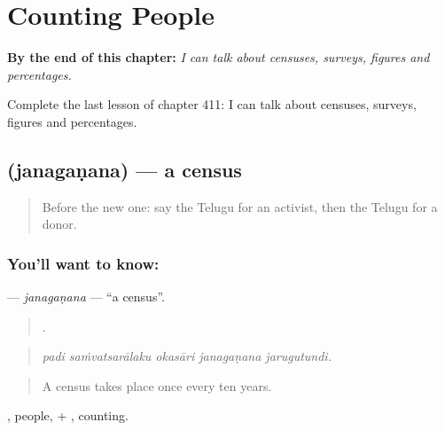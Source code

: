 
\chapter{Counting People}
\label{ch:te-counting-people}

\begin{chapteropening}
\textbf{By the end of this chapter:} \emph{I can talk about censuses, surveys, figures and percentages.}

Complete the last lesson of chapter 411: I can talk about censuses, surveys, figures and percentages.
\end{chapteropening}

\section[\texorpdfstring{\te{జనగణన} (janagaṇana)}{జనగణన (janagaṇana)}]{ (janagaṇana) — a census}

\label{lesson:TE-C411-janaganana}



\begin{quote}
Before the new one: say the Telugu for an activist, then the Telugu for a donor.
\end{quote}

\subsection*{You'll want to know: }
\textbf{} — \emph{janagaṇana} — \textquotedblleft{}a census\textquotedblright{}.

\begin{quote}
    .
\end{quote}

\begin{quote}
\emph{padi saṁvatsarālaku okasāri janagaṇana jarugutundi.}
\end{quote}

\begin{quote}
A census takes place once every ten years.
\end{quote}

, people, + , counting.

